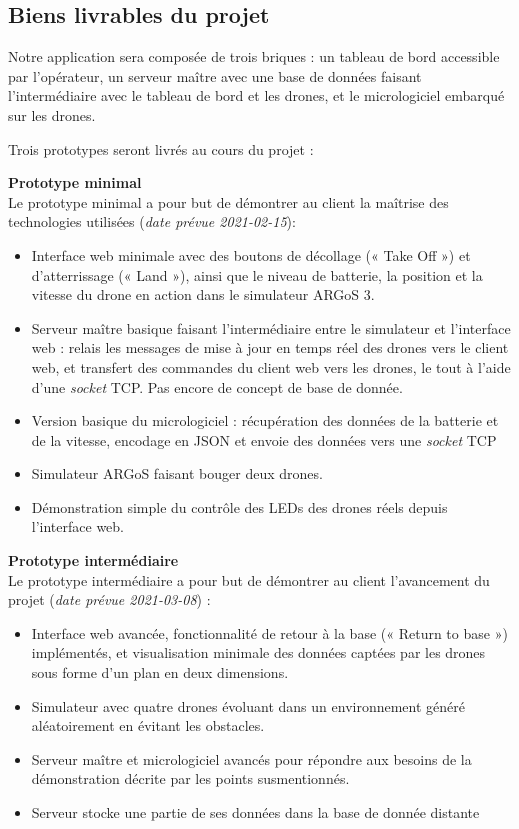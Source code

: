 \documentclass{mistcoursedoc}
\begin{document}
\subsection{Biens livrables du projet}
Notre application sera composée de trois briques : un tableau de bord accessible par l'opérateur, un serveur maître avec une base de données faisant l'intermédiaire avec le tableau de bord et les drones, et le micrologiciel embarqué sur les drones.

Trois prototypes seront livrés au cours du projet :

\textbf{Prototype minimal}\\
  Le prototype minimal a pour but de démontrer au client la maîtrise des technologies utilisées (\textit{date prévue 2021-02-15}):
        \begin{itemize}
          \item Interface web minimale avec des boutons de décollage (« Take Off ») et d’atterrissage (« Land »), ainsi que le niveau de batterie, la position et la vitesse du drone en action dans le simulateur ARGoS 3.
          \item Serveur maître basique faisant l’intermédiaire entre le simulateur et l’interface web : relais les messages de mise à jour en temps réel des drones vers le client web, et transfert des commandes du client web vers les drones, le tout à l'aide d'une \emph{socket} TCP. Pas encore de concept de base de donnée.
          \item Version basique du micrologiciel : récupération des données de la batterie et de la vitesse, encodage en JSON et envoie des données vers une \emph{socket} TCP
          \item Simulateur ARGoS faisant bouger deux drones.
          \item Démonstration simple du contrôle des LEDs des drones réels depuis l'interface web.
        \end{itemize}
\textbf{Prototype intermédiaire}\\
  Le prototype intermédiaire a pour but de démontrer au client l'avancement du projet (\textit{date prévue 2021-03-08}) :
        \begin{itemize}
          \item Interface web avancée, fonctionnalité de retour à la base (« Return to base ») implémentés, et visualisation minimale des données captées par les drones sous forme d'un plan en deux dimensions.
          \item Simulateur avec quatre drones évoluant dans un environnement généré aléatoirement en évitant les obstacles.
          \item Serveur maître et micrologiciel avancés pour répondre aux besoins de la démonstration décrite par les points susmentionnés.
          \item Serveur stocke une partie de ses données dans la base de donnée distante
        \end{itemize}
\end{document}
